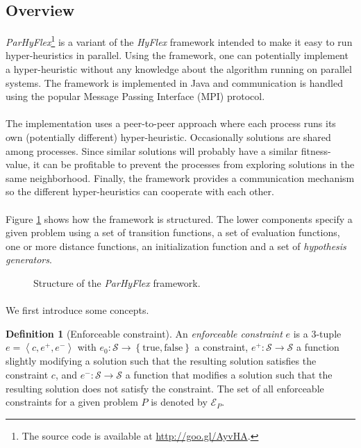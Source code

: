 \documentclass[a4paper,10pt]{article}
\newcommand{\tupl}[1]{\ensuremath{\left\langle #1 \right\rangle}}
\newcommand{\accl}[1]{\ensuremath{\left\{ #1 \right\}}}
\newcommand{\BoolSet}{\accl{\mbox{true},\mbox{false}}}
\newcommand{\calS}{\ensuremath{\mathcal{S}}}
\newcommand{\calE}{\ensuremath{\mathcal{E}}}
\theoremstyle{definition}
\newtheorem{definition}{Definition}
\begin{document}
\subsection{Overview}

\emph{ParHyFlex}\footnote{The source code is available at \url{http://goo.gl/AyvHA}.} is a variant of the \emph{HyFlex} framework intended to make it easy to run hyper-heuristics in parallel. Using the framework, one can potentially implement a hyper-heuristic without any knowledge about the algorithm running on parallel systems. The framework is implemented in Java and communication is handled using the popular Message Passing Interface (MPI) protocol.

\paragraph{}
The implementation uses a peer-to-peer approach where each process runs its own (potentially different) hyper-heuristic. Occasionally solutions are shared among processes. Since similar solutions will probably have a similar fitness-value, it can be profitable to prevent the processes from exploring solutions in the same neighborhood. Finally, the framework provides a communication mechanism so the different hyper-heuristics can cooperate with each other.

\paragraph{}
Figure \ref{fig:parhyflexstructure} shows how the framework is structured. The lower components specify a given problem using a set of transition functions, a set of evaluation functions, one or more distance functions, an initialization function and a set of \emph{hypothesis generators}.
\begin{figure}[hbt]
\centering
\def\sc{1.45}
\caption{Structure of the \emph{ParHyFlex} framework.}
\label{fig:parhyflexstructure}
\end{figure}

\paragraph{}
We first introduce some concepts.

\begin{definition}[Enforceable constraint]
An \emph{enforceable constraint} $e$ is a 3-tuple $e=\tupl{c,e^+,e^-}$ with $e_0:\calS\rightarrow\BoolSet$ a constraint, $e^+:\calS\rightarrow\calS$ a function slightly modifying a solution such that the resulting solution satisfies the constraint $c$, and $e^-:\calS\rightarrow\calS$ a function that modifies a solution such that the resulting solution does not satisfy the constraint. The set of all enforceable constraints for a given problem $P$ is denoted by $\calE_P$.
\end{definition}
\end{document}
